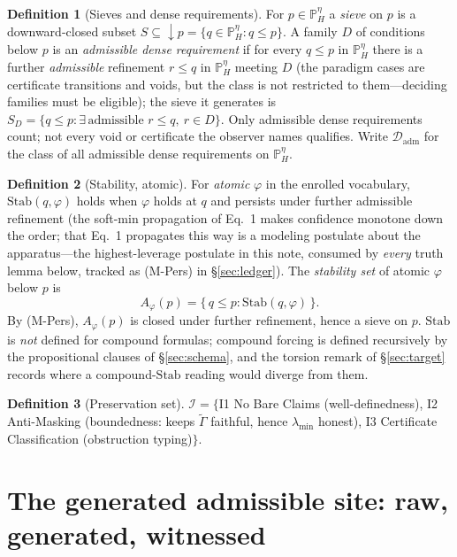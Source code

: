 \documentclass[11pt]{article}
\theoremstyle{definition}
\newtheorem{definition}{Definition}
\theoremstyle{remark}
\newcommand{\PHeta}{\mathbb{P}_{H}^{\eta}}
\newcommand{\refines}{\leq}
\newcommand{\Gam}{\tilde{\Gamma}}
\newcommand{\lmin}{\lambda_{\min}}
\newcommand{\Stab}{\mathrm{Stab}}
\newcommand{\Dadm}{\mathcal{D}_{\mathrm{adm}}}
\begin{document}
\begin{definition}[Sieves and dense requirements]\label{def:req}
For $p\in\PHeta$ a \emph{sieve} on $p$ is a downward-closed subset $S\subseteq{\downarrow}p=\{q\in\PHeta:q\refines p\}$.
A family $D$ of conditions below $p$ is an \emph{admissible dense
requirement} if for every $q\refines p$ in $\PHeta$ there is a further \emph{admissible} refinement
$r\refines q$ in $\PHeta$ meeting $D$ (the paradigm cases are certificate transitions and voids,
but the class is not restricted to them---deciding families must be eligible); the sieve it generates is
$S_D=\{q\refines p:\exists\,\text{admissible }r\refines q,\ r\in D\}$. Only admissible dense
requirements count; not every void or certificate the observer names qualifies. Write $\Dadm$ for the
class of all admissible dense requirements on $\PHeta$.
\end{definition}

\begin{definition}[Stability, atomic]\label{def:stab}
For \emph{atomic} $\varphi$ in the enrolled vocabulary, $\Stab(q,\varphi)$ holds when $\varphi$
holds at $q$ and persists under further admissible refinement (the soft-min propagation of Eq.~1
makes confidence monotone down the order; that Eq.~1 propagates this way is a modeling postulate
about the apparatus---the highest-leverage postulate in this note, consumed by \emph{every} truth
lemma below, tracked as (M-Pers) in \S\ref{sec:ledger}). The \emph{stability set} of atomic
$\varphi$ below $p$ is
\[
  A_\varphi(p)=\{\,q\refines p:\Stab(q,\varphi)\,\}.
\]
By (M-Pers), $A_\varphi(p)$ is closed under further refinement, hence a sieve on $p$. $\Stab$ is
\emph{not} defined for compound formulas; compound forcing is defined recursively by the
propositional clauses of \S\ref{sec:schema}, and the torsion remark of \S\ref{sec:target} records
where a compound-$\Stab$ reading would diverge from them.
\end{definition}

\begin{definition}[Preservation set]
$\mathcal{I}=\{$I1 No Bare Claims (well-definedness), I2 Anti-Masking (boundedness: keeps $\Gam$
faithful, hence $\lmin$ honest), I3 Certificate Classification (obstruction typing)$\}$.
\end{definition}

\section{The generated admissible site: raw, generated, witnessed}\label{sec:site}
\end{document}
